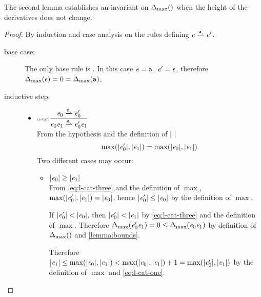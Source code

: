 The second lemma establishes an invariant on ${\Delta_{\max}}({})$ when the height of the derivatives does not change.

\begin{proof}
 By induction and case analysis on the rules defining $\re\parDer{\sym}\re'$.
 \begin{description}
  \item[base case:] The only base rule is .
   In this case $\mathit {e}=\mathtt {a}$, $\mathit {e}'=\mathtt {\epsilon}$, therefore ${\Delta_{\max}}({\mathtt {\epsilon}})=0={\Delta_{\max}}({\mathtt {a}})$.
  \item[inductive step:] \hspace*{\fill}
   \begin{itemize}
    \item $\Rule{l-cat}{\re_0\parDer{\sym}\re'_0}{\re_0\catop\re_1\parDer{\sym}\re'_0\catop\re_1}{}$\\[2ex]
          From the hypothesis and the definition of ${\mid}{\ }{\mid}$
          \begin{equation}
           \label{eq:l-cat-three}
           \max({\mid}{\mathit {e}_0'}{\mid},{\mid}{\mathit {e}_1}{\mid})=\max({\mid}{\mathit {e}_0}{\mid},{\mid}{\mathit {e}_1}{\mid})
          \end{equation}
          Two different cases may occur:
          \begin{itemize}
           \item ${\mid}{\mathit {e}_0}{\mid}\geq{\mid}{\ensuremath{\mathit {e}}_1}{\mid}$\\
                 From \cref{eq:l-cat-three} and the definition of $\max$, $\max({\mid}{\mathit {e}_0'}{\mid},{\mid}{\mathit {e}_1}{\mid})={\mid}{\mathit {e}_0}{\mid}$, hence ${\mid}{\mathit {e}_0'}{\mid}\leq{\mid}{\ensuremath{\mathit {e}}_0}{\mid}$ by the definition of $\max$.

                 If ${\mid}{\mathit {e}_0'}{\mid}<{\mid}{\mathit {e}_0}{\mid}$, then ${\mid}{\mathit {e}_0'}{\mid}<{\mid}{\mathit {e}_1}{\mid}$ by \cref{eq:l-cat-three} and the definition of $\max$. Therefore ${\Delta_{\max}}({\mathit {e}_0'\mathit {e}_1})=0\leq{\Delta_{\max}}({\mathit {e}_0\mathit {e}_1})$ by definition of ${\Delta_{\max}}({})$ and \cref{lemma:bounds}.

                 Therefore ${\mid}{\mathit {e}_1}{\mid}\leq\max({\mid}{\mathit {e}_0}{\mid},{\mid}{\mathit {e}_1}{\mid})<\max({\mid}{\mathit {e}_0}{\mid},{\mid}{\mathit {e}_1}{\mid})+1=\max({\mid}{\mathit {e}_0'}{\mid},{\mid}{\mathit {e}_1}{\mid})$ by the definition of $\max$ and \cref{eq:l-cat-one}.


\end{itemize}
\end{itemize}
\end{description}
\end{proof}
